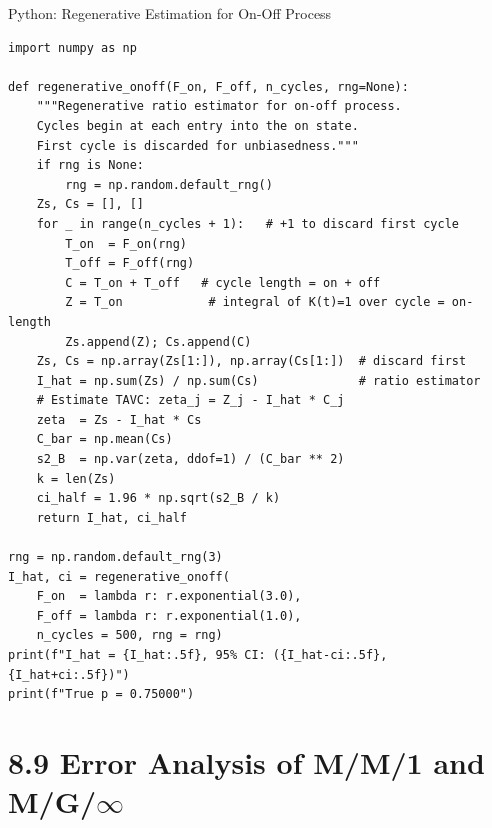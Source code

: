 \documentclass[aspectratio=169,10pt]{beamer}
\begin{document}
\begin{frame}[fragile]{Python: Regenerative Estimation for On-Off Process}
\begin{lstlisting}[style=python]
import numpy as np

def regenerative_onoff(F_on, F_off, n_cycles, rng=None):
    """Regenerative ratio estimator for on-off process.
    Cycles begin at each entry into the on state.
    First cycle is discarded for unbiasedness."""
    if rng is None:
        rng = np.random.default_rng()
    Zs, Cs = [], []
    for _ in range(n_cycles + 1):   # +1 to discard first cycle
        T_on  = F_on(rng)
        T_off = F_off(rng)
        C = T_on + T_off   # cycle length = on + off
        Z = T_on            # integral of K(t)=1 over cycle = on-length
        Zs.append(Z); Cs.append(C)
    Zs, Cs = np.array(Zs[1:]), np.array(Cs[1:])  # discard first
    I_hat = np.sum(Zs) / np.sum(Cs)              # ratio estimator
    # Estimate TAVC: zeta_j = Z_j - I_hat * C_j
    zeta  = Zs - I_hat * Cs
    C_bar = np.mean(Cs)
    s2_B  = np.var(zeta, ddof=1) / (C_bar ** 2)
    k = len(Zs)
    ci_half = 1.96 * np.sqrt(s2_B / k)
    return I_hat, ci_half

rng = np.random.default_rng(3)
I_hat, ci = regenerative_onoff(
    F_on  = lambda r: r.exponential(3.0),
    F_off = lambda r: r.exponential(1.0),
    n_cycles = 500, rng = rng)
print(f"I_hat = {I_hat:.5f}, 95% CI: ({I_hat-ci:.5f}, {I_hat+ci:.5f})")
print(f"True p = 0.75000")
\end{lstlisting}
\end{frame}

\section{8.9 Error Analysis of M/M/1 and M/G/$\infty$}
\end{document}
